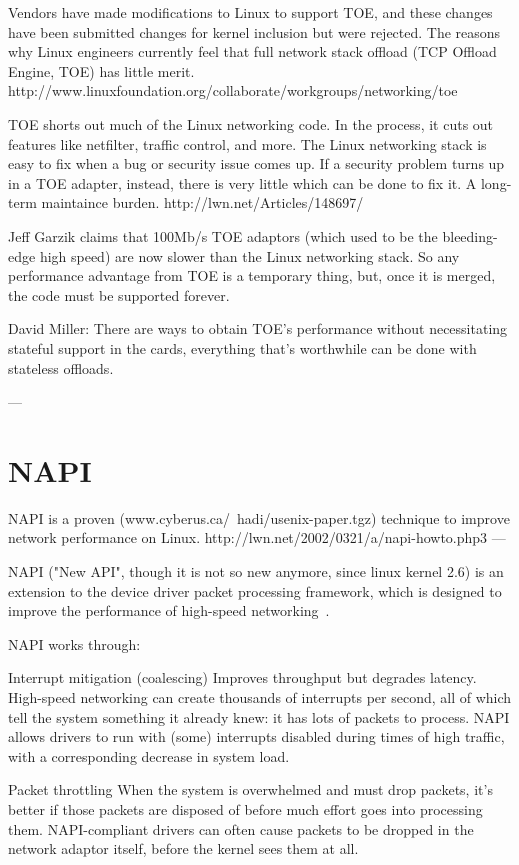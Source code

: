 Vendors have made modifications to Linux to support TOE, and these changes have been submitted changes for kernel inclusion but were rejected.
The reasons why Linux engineers currently feel that full network stack offload (TCP Offload Engine, TOE) has little merit.
http://www.linuxfoundation.org/collaborate/workgroups/networking/toe

TOE shorts out much of the Linux networking code.
In the process, it cuts out features like netfilter, traffic control, and more.
The Linux networking stack is easy to fix when a bug or security issue comes up. If a security problem turns up in a TOE adapter, instead, there is very little which can be done to fix it.
A long-term maintaince burden. http://lwn.net/Articles/148697/

Jeff Garzik claims that 100Mb/s TOE adaptors
(which used to be the bleeding-edge high speed)
are now slower than the Linux networking stack.
So any performance advantage from TOE is a temporary thing, but, once it is merged, the code must be supported forever.

David Miller: There are ways to obtain TOE's performance without
necessitating stateful support in the cards, everything that's
worthwhile can be done with stateless offloads.

---


\section{NAPI}

NAPI is a proven (www.cyberus.ca/~hadi/usenix-paper.tgz) technique
to improve network performance on Linux.
http://lwn.net/2002/0321/a/napi-howto.php3
---

NAPI ("New API", though it is not so new anymore, since linux kernel 2.6) is an extension to the device driver packet processing framework, which is designed to improve the performance of high-speed networking~\cite{linux-foundation-napi}.

NAPI works through:

Interrupt mitigation (coalescing)
 Improves throughput but degrades latency.
    High-speed networking can create thousands of interrupts per second, all of which tell the system something it already knew: it has lots of packets to process. NAPI allows drivers to run with (some) interrupts disabled during times of high traffic, with a corresponding decrease in system load.

Packet throttling 
    When the system is overwhelmed and must drop packets, it's better if those packets are disposed of before much effort goes into processing them. NAPI-compliant drivers can often cause packets to be dropped in the network adaptor itself, before the kernel sees them at all.

